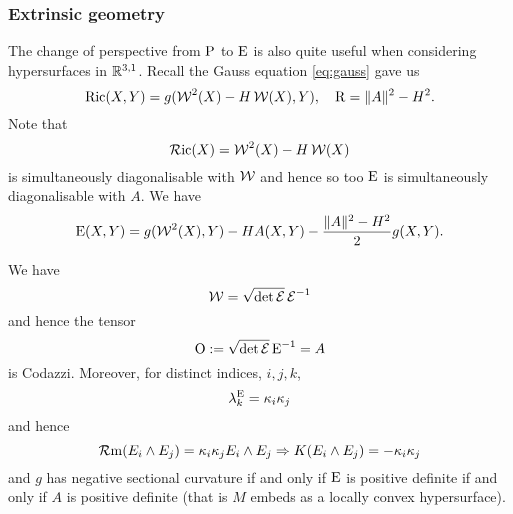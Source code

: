 \documentclass[a4paper, 12pt]{amsart}
\begin{document}
\subsubsection{Extrinsic geometry}
The change of perspective from \(\operatorname{P}\) to \(\operatorname{E}\) is also quite useful when considering hypersurfaces in \(\mathbb{R}^{3,1}\). Recall the Gauss equation \eqref{eq:gauss} gave us
\[
\operatorname{Ric}(X, Y) = g(\operatorname{\mathcal{W}}^2(X) - H \operatorname{\mathcal{W}}(X), Y), \quad \operatorname{R} = \|A\|^2 - H^2.
\]
Note that
\[
\operatorname{\mathcal{R}ic} (X) = \operatorname{\mathcal{W}}^2(X) - H \operatorname{\mathcal{W}}(X)
\]
is simultaneously diagonalisable with \(\operatorname{\mathcal{W}}\) and hence so too \(\operatorname{E}\) is simultaneously diagonalisable with \(A\). We have
\begin{equation}
\label{eq:ein_extrinsic}
\operatorname{E} (X, Y) = g(\operatorname{\mathcal{W}}^2(X), Y) - H A(X, Y) - \frac{\|A\|^2 - H^2}{2} g (X, Y).
\end{equation}
\begin{lemma}
\label{lem:ein_W}
We have
\[
\operatorname{\mathcal{W}} = \sqrt{\det \operatorname{\mathcal{E}}} \operatorname{\mathcal{E}}^{-1}
\]
and hence the tensor
\[
\operatorname{O} := \sqrt{\det \operatorname{\mathcal{E}}} \operatorname{E}^{-1} = A
\]
is Codazzi. Moreover, for distinct indices, \(i,j,k\),
\[
\lambda^{\operatorname{E}}_k = \kappa_i\kappa_j
\]
and hence
\[
\operatorname{\mathcal{R}m} (E_i \wedge E_j) = \kappa_i \kappa_j E_i \wedge E_j \Rightarrow K(E_i \wedge E_j) = -\kappa_i \kappa_j
\]
and \(g\) has negative sectional curvature if and only if \(\operatorname{E}\) is positive definite if and only if \(A\) is positive definite (that is \(M\) embeds as a locally convex hypersurface).
\end{lemma}
\end{document}
